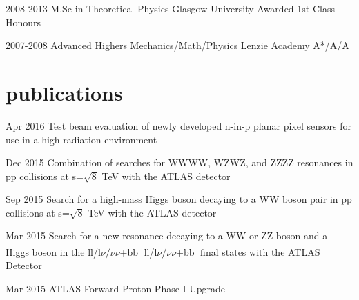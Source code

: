 \documentclass[]{twentysecondcv}
\begin{document}
\begin{twenty}
  \twentyitem
    {2008-2013}
    {M.Sc in Theoretical Physics }
    {Glasgow University}
    {Awarded 1st Class Honours}
\end{twenty}

\begin{twenty}
  \twentyitem
    {2007-2008}
    {Advanced Highers Mechanics/Math/Physics }
    {Lenzie Academy}
    {A*/A/A}
\end{twenty}



\section{publications}

\begin{twentyshort}
  \twentyitemshort
    {Apr 2016}
    {Test beam evaluation of newly developed n-in-p planar pixel sensors for use in a high radiation environment}
\end{twentyshort}


\begin{twentyshort}
  \twentyitemshort
    {Dec 2015}
    {Combination of searches for WWWW, WZWZ, and ZZZZ resonances in pp collisions at s=$\sqrt{8}$ TeV with the ATLAS detector}
\end{twentyshort}


\begin{twentyshort}
  \twentyitemshort
    {Sep 2015}
    {Search for a high-mass Higgs boson decaying to a WW boson pair in pp collisions at s=$\sqrt{8}$ TeV with the ATLAS detector  }
\end{twentyshort}


\begin{twentyshort}
  \twentyitemshort
    {Mar 2015}
    {Search for a new resonance decaying to a WW or ZZ boson and a Higgs boson in the ll/l$\nu/\nu\nu$+bb\textsuperscript{-} ll/l$\nu/\nu\nu$+bb\textsuperscript{-} final states with the ATLAS Detector}
\end{twentyshort}


\begin{twentyshort}
  \twentyitemshort
    {Mar 2015}
    {ATLAS Forward Proton Phase-I Upgrade }
\end{twentyshort}
\end{document}
